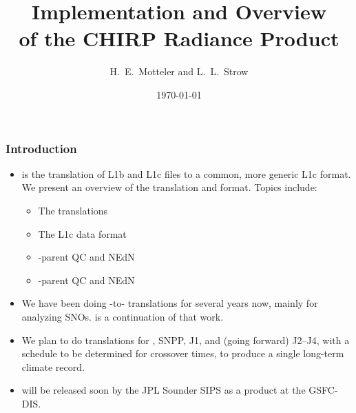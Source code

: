 \documentclass[9pt]{beamer}
\title{
  Implementation and Overview \\
  of the CHIRP Radiance Product \\
}
\author{H.~E.~Motteler and L.~L.~Strow}
\institute{
  UMBC Atmospheric Spectroscopy Lab \\
  Joint Center for Earth Systems Technology \\
}
\date{\today}
\begin{document}
\begin{frame}[plain]
\titlepage
\end{frame}
\begin{frame}
\frametitle{Introduction}
\begin{itemize}

  \item {\chirp} is the translation of {\cris} L1b and {\airs} L1c files 
    to a common, more generic L1c format.  We present an overview of the
    translation and format.  Topics include:

  \begin{itemize}
    \item The {\chirp} translations
    \item The {\chirp} L1c data format
    \item {\airs}-parent QC and NEdN
    \item {\cris}-parent QC and NEdN
  \end{itemize}

  \item We have been doing {\airs}-to-{\cris} translations for
    several years now, mainly for analyzing SNOs.  {\chirp} is
    a continuation of that work.

  \item We plan to do {\chirp} translations for {\airs}, {\cris}
    SNPP, {\cris} J1, and (going forward) J2--J4, with a schedule to
    be determined for crossover times, to produce a single long-term
    climate record.

  \item {\chirp} will be released soon by the JPL Sounder SIPS as a
    product at the GSFC-DIS.

\end{itemize}
\end{frame}
\end{document}
